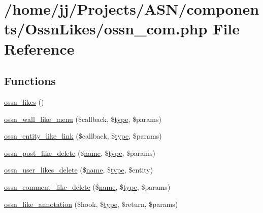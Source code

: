 \hypertarget{_ossn_likes_2ossn__com_8php}{}\section{/home/jj/\+Projects/\+A\+S\+N/components/\+Ossn\+Likes/ossn\+\_\+com.php File Reference}
\label{_ossn_likes_2ossn__com_8php}
\subsection*{Functions}
\begin{DoxyCompactItemize}
\item 
\hyperlink{_ossn_likes_2ossn__com_8php_a4e959a7071f0cbb9dbbab00e1a0e350f}{ossn\+\_\+likes} ()
\item 
\hyperlink{_ossn_likes_2ossn__com_8php_ad92c5fb743c9e797db697662ad659a59}{ossn\+\_\+wall\+\_\+like\+\_\+menu} (\$callback, \$\hyperlink{_ossn_wall_2actions_2wall_2post_2group_8php_a2dc1bb4e1ed0029daa81ac0776b14b51}{type}, \$params)
\item 
\hyperlink{_ossn_likes_2ossn__com_8php_ad49a2c4561bb8a3f79dd410040dbcdd3}{ossn\+\_\+entity\+\_\+like\+\_\+link} (\$callback, \$\hyperlink{_ossn_wall_2actions_2wall_2post_2group_8php_a2dc1bb4e1ed0029daa81ac0776b14b51}{type}, \$params)
\item 
\hyperlink{_ossn_likes_2ossn__com_8php_a67aa5709f48a2707d22d378c85a967b9}{ossn\+\_\+post\+\_\+like\+\_\+delete} (\$\hyperlink{user_8php_a765af5e9671743530143a6d3670fd9a6}{name}, \$\hyperlink{_ossn_wall_2actions_2wall_2post_2group_8php_a2dc1bb4e1ed0029daa81ac0776b14b51}{type}, \$params)
\item 
\hyperlink{_ossn_likes_2ossn__com_8php_af04920097e2d7c82f6454a25fced4458}{ossn\+\_\+user\+\_\+likes\+\_\+delete} (\$\hyperlink{user_8php_a765af5e9671743530143a6d3670fd9a6}{name}, \$\hyperlink{_ossn_wall_2actions_2wall_2post_2group_8php_a2dc1bb4e1ed0029daa81ac0776b14b51}{type}, \$entity)
\item 
\hyperlink{_ossn_likes_2ossn__com_8php_ac0a6e04d8cf7e5c77166452593c2e912}{ossn\+\_\+comment\+\_\+like\+\_\+delete} (\$\hyperlink{user_8php_a765af5e9671743530143a6d3670fd9a6}{name}, \$\hyperlink{_ossn_wall_2actions_2wall_2post_2group_8php_a2dc1bb4e1ed0029daa81ac0776b14b51}{type}, \$params)
\item 
\hyperlink{_ossn_likes_2ossn__com_8php_a27dafa367ef2d045bff4f71305181d6a}{ossn\+\_\+like\+\_\+annotation} (\$hook, \$\hyperlink{_ossn_wall_2actions_2wall_2post_2group_8php_a2dc1bb4e1ed0029daa81ac0776b14b51}{type}, \$return, \$params)

\end{DoxyCompactItemize}
